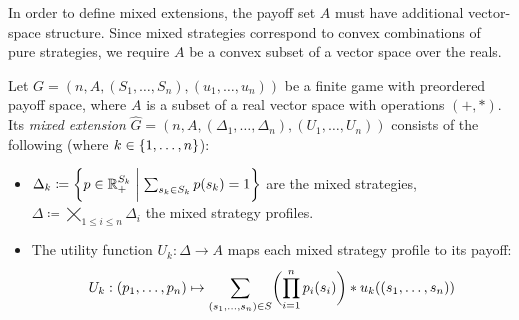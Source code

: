 \documentclass[a4paper]{scrreprt}
\newcommand{\Rp}{\mathbb{R}_+}
\newcommand{\B}{\mathcal{B}}
\begin{document}
    In order to define mixed extensions, the payoff set $A$ must have additional vector-space structure. Since mixed strategies correspond to convex combinations of pure strategies, we require $A$ be a convex subset of a vector space over the reals.
    \begin{defn}
        Let $G = (n, A, (S_1, \dots, S_n), (u_1, \dots, u_n))$ be a finite game with preordered payoff space,
        where $A$ is a subset of a real vector space with operations $(+, *)$.
        Its \emph{mixed extension} $\hat{G} = (n, A, (\Delta_1, \dots, \Delta_n), (U_1, \dots, U_n))$ consists of the following (where $k \in \{1, \dots, n\}$):        
        \begin{itemize} %
            \item $\Delta_k \coloneqq \biggset{ p \in \Rp^{S_k} \biggmid \sum_{s_k \in S_k} p(s_k) = 1 } $ are the mixed strategies, $\Delta \coloneqq \bigtimes\limits_{1\leq i \leq n} \Delta_i$ the mixed strategy profiles.
            
            \item
            The utility function $U_k: \Delta \to A$ maps each mixed strategy profile to
            its payoff:
            \begin{gather}
            U_k: 
            (p_1, \dots, p_n) 
            \mapsto
            \sum_{(s_1, \dots, s_n) \in S} \biggl(\prod_{i=1}^{n} p_i(s_i)\biggr) * u_k( (s_1, \dots, s_n) )
            \label{eq:preorderedPayoffSpaceMixedStrategyUtility}
            \end{gather}
        \end{itemize}
    \end{defn}
    
\end{document}
